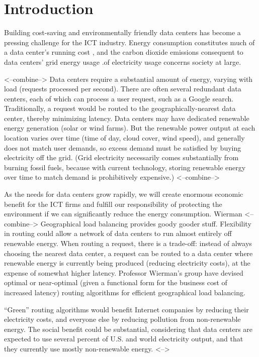 \documentclass{acm_proc_article-sp}
\begin{document}
\section{Introduction}
Building cost-saving and environmentally friendly data centers has become a pressing challenge for the ICT industry.
Energy consumption constitutes much of a data center’s running cost \cite{datacenter}, and the carbon dioxide emissions consequent to data centers’ grid energy usage .of electricity usage concerns society at large.

<--combine-->
Data centers require a substantial amount of energy, varying with load (requests processed per second). There are often several redundant data centers, each of which can process a user request, such as a Google search. Traditionally, a request would be routed to the geographically-nearest data center, thereby minimizing latency. Data centers may have dedicated renewable energy generation (solar or wind farms). But the renewable power output at each location varies over time (time of day, cloud cover, wind speed), and generally does not match user demands, so excess demand must be satisfied by buying electricity off the grid. (Grid electricity necessarily comes substantially from burning fossil fuels, because with current technology, storing renewable energy over time to match demand is prohibitively expensive.)
<--combine-->

As the needs for data centers grow rapidly, we will create enormous economic benefit for the ICT firms and fulfill our responsibility of protecting the environment if we can significantly reduce the energy consumption.
Wierman
<--combine-->
Geographical load balancing provides goody gooder stuff. Flexibility in routing could allow a network of data centers to run almost entirely off renewable energy. When routing a request, there is a trade-off: instead of always choosing the nearest data center, a request can be routed to a data center where renewable energy is currently being produced (reducing electricity costs), at the expense of somewhat higher latency. Professor Wierman’s group have devised optimal or near-optimal (given a functional form for the business cost of increased latency) routing algorithms for efficient geographical load balancing.

“Green” routing algorithms would benefit Internet companies by reducing their electricity costs, and everyone else by reducing pollution from non-renewable energy. The social benefit could be substantial, considering that data centers are expected to use several percent of U.S. and world electricity output, and that they currently use mostly non-renewable energy.
<-->
\end{document}
